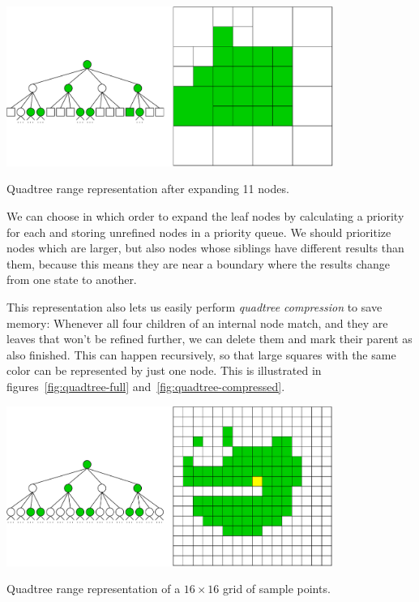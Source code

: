 \begin{center}
    \captionsetup{type=figure}
    \includegraphics[width=0.8\textwidth]{img/quadtree 11.pdf}
    \caption{Quadtree range representation after expanding 11 nodes.}
    \label{fig:quadtree-11}
\end{center}

We can choose in which order to expand the leaf nodes by calculating a priority for each and storing unrefined nodes in a priority queue.
We should prioritize nodes which are larger, but also nodes whose siblings have different results than them, because this means they are near a boundary where the results change from one state to another.

This representation also lets us easily perform \emph{quadtree compression} to save memory:
Whenever all four children of an internal node match, and they are leaves that won't be refined further, we can delete them and mark their parent as also finished.
This can happen recursively, so that large squares with the same color can be represented by just one node.
This is illustrated in figures~\ref{fig:quadtree-full} and~\ref{fig:quadtree-compressed}.

\begin{center}
    \captionsetup{type=figure}
    \includegraphics[width=0.8\textwidth]{img/quadtree full.pdf}
    \caption{Quadtree range representation of a $16\times16$ grid of sample points.}
    \label{fig:quadtree-full}
\end{center}

